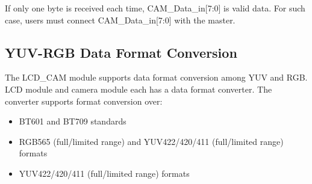 \documentclass[main\_\_EN.tex]{subfiles}
\begin{document}
\begin{tiplisting}
If only one byte is received each time, CAM\_Data\_in[7:0] is valid data. For such case, users must connect CAM\_Data\_in[7:0] with the master.
\end{tiplisting}

\subsection{YUV-RGB Data Format Conversion}
The LCD\_CAM module supports data format conversion among YUV and RGB. LCD module and camera module each has a data format converter. The converter supports format conversion over:
\begin{itemize}
    \item BT601 and BT709 standards
    \item RGB565 (full/limited range) and YUV422/420/411 (full/limited range) formats
    \item YUV422/420/411 (full/limited range) formats
\end{itemize}
\end{document}
